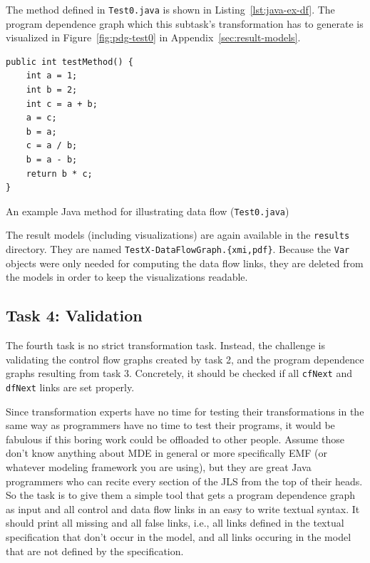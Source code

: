 \documentclass[11pt]{article}
\begin{document}
The method defined in \verb|Test0.java| is shown in
Listing~\ref{lst:java-ex-df}.  The program dependence graph which this
subtask's transformation has to generate is visualized in
Figure~\ref{fig:pdg-test0} in Appendix~\ref{sec:result-models}.

\begin{listing}
  \begin{verbatim}
public int testMethod() {
    int a = 1;
    int b = 2;
    int c = a + b;
    a = c;
    b = a;
    c = a / b;
    b = a - b;
    return b * c;
}
  \end{verbatim}
  \caption{An example Java method for illustrating data flow
    (\texttt{Test0.java})}
  \label{lst:java-ex-df}
\end{listing}

The result models (including visualizations) are again available in the
\verb|results| directory.  They are named \verb|TestX-DataFlowGraph.{xmi,pdf}|.
Because the \verb|Var| objects were only needed for computing the data flow
links, they are deleted from the models in order to keep the visualizations
readable.


\subsection{Task 4: Validation}
\label{sec:task4-validation}


The fourth task is no strict transformation task.  Instead, the challenge is
validating the control flow graphs created by task 2, and the program
dependence graphs resulting from task 3.  Concretely, it should be checked if
all \verb|cfNext| and \verb|dfNext| links are set properly.

Since transformation experts have no time for testing their transformations in
the same way as programmers have no time to test their programs, it would be
fabulous if this boring work could be offloaded to other people.  Assume those
don't know anything about MDE in general or more specifically EMF (or whatever
modeling framework you are using), but they are great Java programmers who can
recite every section of the JLS \cite{Java7Spec} from the top of their heads.
So the task is to give them a simple tool that gets a program dependence graph
as input and all control and data flow links in an easy to write textual
syntax.  It should print all missing and all false links, i.e., all links
defined in the textual specification that don't occur in the model, and all
links occuring in the model that are not defined by the specification.
\end{document}
